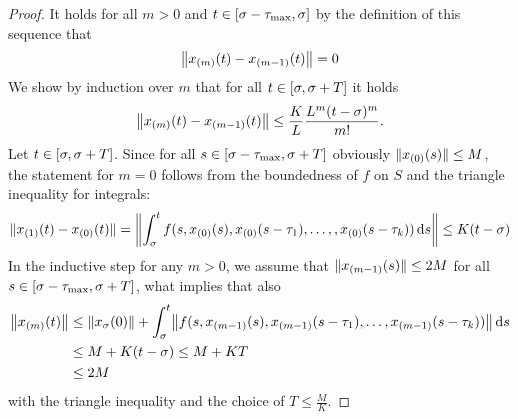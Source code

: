\begin{proof}
        It holds for all $m>0$ and $t\in \compactum{\tzero-\taumax}{\tzero}$ by the definition of this sequence that
        \begin{equation*}
            \nnorm*{x_{(m)}(t)-x_{(m-1)}(t)}=0
        \end{equation*}
        We show by induction over $m$ that for all $t\in [\tzero,\tzero+T]$ it holds
        \begin{equation*}
            \nnorm*{x_{(m)}(t)-x_{(m-1)}(t)} \leq \frac{K}{L}\frac{L^m (t-\tzero)^m}{m!}.
        \end{equation*}
        Let $t\in [\tzero,\tzero+T]$. Since for all $s\in [\tzero-\taumax,\tzero+T]$ obviously $\nnorm{x_{(0)}(s)}\leq M$, the statement for $m=0$ follows from the boundedness of $f$ on $S$ and the triangle inequality for integrals:
        \begin{equation*}
            \nnorm{x_{(1)}(t)-x_{(0)}(t)} = \nnorm*{\integral{\tzero}{t} f(s,x_{(0)}(s),x_{(0)}(s-\tau_1),\ldots,,x_{(0)}(s-\tau_k))\dx[s]} \leq K(t-\tzero)
        \end{equation*}
        In the inductive step for any $m>0$, we assume that $\nnorm{x_{(m-1)}(s)}\leq 2M$ for all $s\in [\tzero-\taumax,\tzero+T]$, what implies that also
        \begin{align}\label{eq:bounded-xm}
            \nnorm*{x_{(m)}(t)} &\leq \nnorm*{x_\tzero(0)} + \integral{\tzero}{t} \nnorm*{f(s,x_{(m-1)}(s),x_{(m-1)}(s-\tau_1),\ldots,x_{(m-1)}(s-\tau_k))}\dx[s] \nonumber \\
            &\leq M + K(t-\tzero) \leq M+KT \nonumber \\
            &\leq 2M
        \end{align}
        with the triangle inequality and the choice of $T\leq\frac{M}{K}$.


\end{proof}
